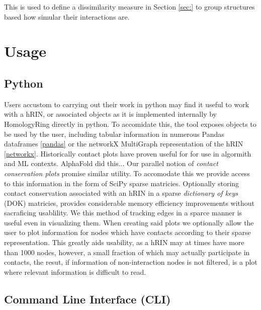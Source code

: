 This is used to define a dissimilarity measure in Section \ref{sec:} to group structures based how simular their interactions are.


\section{Usage}
\subsection{Python}
Users accustom to carrying out their work in python may find it useful to work with a hRIN, or associated objects as it is implemented internally by HomologyRing directly in python. To accomidate this, the tool exposes objects to be used by the user, including tabular information in numerous Pandas dataframes \ref{pandas} or the networkX MultiGraph representation of the hRIN \ref{networkx}.
Historically contact plots have proven useful for for use in algormith and ML contexts. 
AlphaFold did this... %
Our parallel notion of \emph{contact conservation plots} promise similar utility. To accomodate this we provide access to this information in the form of SciPy sparse matricies. 
Optionally storing contact conservation associated with an hRIN in a sparse \emph{dictionary of keys} (DOK) matricies, provides considerable memory efficiency improvements without sacraficing usablility. 
We this method of tracking edges in a sparce manner is useful even in visualizing them. When creating said plots we optionally allow the user to plot information for nodes which have contacts according to their sparse representation. This greatly aids usability, as a hRIN may at times have more than 1000 nodes, however, a small fraction of which may actually participate in contacts, the resut, if information of non-interaction nodes is not filtered, is a plot where relevant information is difficult to read.

\subsection{Command Line Interface (CLI)}

